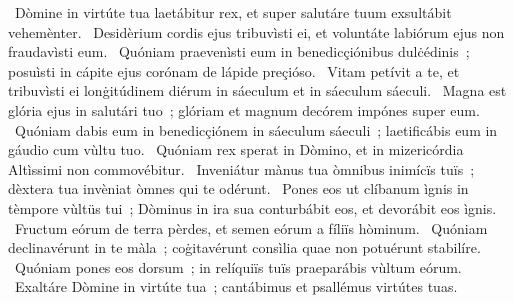 ~Dòmine in virtúte tua laetábitur rex, et super salutáre tuum exsultábit vehemènter. 
~Desidèrium cordis ejus tribuvìsti ei, et voluntáte labiórum ejus non fraudavìsti eum. 
~Quóniam praevenìsti eum in benedicçiónibus dulċédinis~; posuìsti in cápite ejus corónam de lápide preçióso. 
~Vitam petívit a te, et tribuvìsti ei lonġitúdinem diérum in sáeculum et in sáeculum sáeculi. 
~Magna est glória ejus in salutári tuo~; glóriam et magnum decórem impónes super eum. 
~Quóniam dabis eum in benedicçiónem in sáeculum sáeculi~; laetificábis eum in gáudio cum vùltu tuo. 
~Quóniam rex sperat in Dòmino, et in mizericórdia Altìssimi non commovébitur. 
~Inveniátur mànus tua òmnibus inimícïs tuïs~; dèxtera tua invèniat òmnes qui te odérunt. 
~Pones eos ut clíbanum ìgnis in tèmpore vùltüs tui~; Dòminus in ira sua conturbábit eos, et devorábit eos ìgnis. 
~Fructum eórum de terra pèrdes, et semen eórum a fíliïs hòminum. 
~Quóniam declinavérunt in te màla~; coġitavérunt consìlia quae non potuérunt stabilíre. 
~Quóniam pones eos dorsum~; in relíquiïs tuïs praeparábis vùltum eórum. 
~Exaltáre Dòmine in virtúte tua~; cantábimus et psallémus virtútes tuas. 
